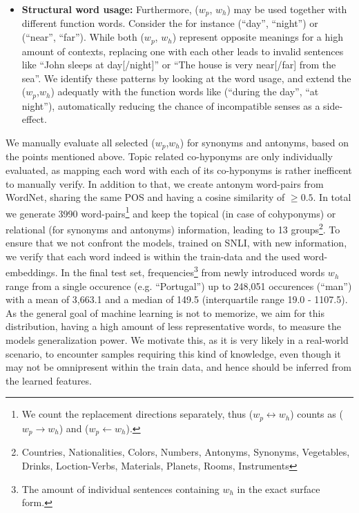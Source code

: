 \begin{itemize}
\item \textbf{Structural word usage:} Furthermore, ($w_p$, $w_h$) may be used together with different function words. Consider the for instance (``day'', ``night'') or (``near'', ``far''). While both ($w_p$, $w_h$) represent opposite meanings for a high amount of contexts, replacing one with each other leads to invalid sentences like ``John sleeps at day[/night]'' or ``The house is very near[/far] from the sea''. We identify these patterns by looking at the word usage, and extend the ($w_p$,$w_h$) adequatly with the function words like (``during the day'', ``at night''), automatically reducing the chance of incompatible senses as a side-effect.
\end{itemize}
We manually evaluate all selected ($w_p$,$w_h$) for synonyms and antonyms, based on the points mentioned above. Topic related co-hyponyms are only individually evaluated, as mapping each word with each of its co-hyponyms is rather inefficent to manually verify. In addition to that, we create antonym word-pairs from WordNet, sharing the same \ac{POS} and having a cosine similarity of $\geq 0.5$. In total we generate 3990 word-pairs\footnote{We count the replacement directions separately, thus ($w_p \leftrightarrow w_h$) counts as ($w_p \rightarrow w_h$) and ($w_p \leftarrow w_h$).} and keep the topical (in case of cohyponyms) or relational (for synonyms and antonyms) information, leading to 13 groups\footnote{Countries, Nationalities, Colors, Numbers, Antonyms, Synonyms, Vegetables, Drinks, Loction-Verbs, Materials, Planets, Rooms, Instruments}. To ensure that we not confront the models, trained on \ac{SNLI}, with new information, we verify that each word indeed is within the train-data and the used word-embeddings. In the final test set, frequencies\footnote{The amount of individual sentences containing $w_h$ in the exact surface form.} from newly introduced words $w_h$ range from a single occurence (e.g. ``Portugal'') up to 248,051 occurences (``man'') with a mean of 3,663.1 and a median of 149.5 (interquartile range 19.0 - 1107.5). As the general goal of machine learning is not to memorize, we aim for this distribution, having a high amount of less representative words, to measure the models generalization power. We motivate this, as it is very likely in a real-world scenario, to encounter samples requiring this kind of knowledge, even though it may not be omnipresent within the train data, and hence should be inferred from the learned features.

